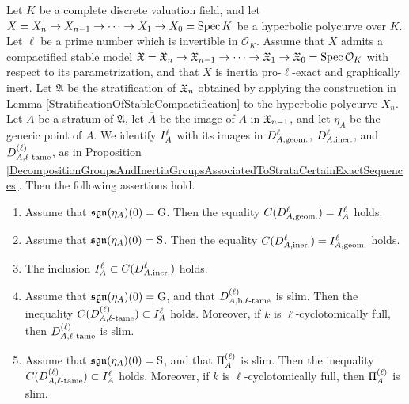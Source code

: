 \begin{prop}\label{ComputationOfCentersOfVariousDecompositionGroups}
  Let $K$ be a complete discrete valuation field, and let $X = X_n \to X_{n - 1} \to \cdots \to X_1 \to X_0 = \mathrm{Spec} \, K$ be a hyperbolic polycurve over $K$. Let $\ell$ be a prime number which is invertible in $\mathcal{O}_K$. Assume that $X$ admits a compactified stable model $\mathfrak{X} = \mathfrak{X}_n \to \mathfrak{X}_{n - 1} \to \cdots \to \mathfrak{X}_1 \to \mathfrak{X}_0 = \mathrm{Spec} \, \mathcal{O}_K$ with respect to its parametrization, and that $X$ is inertia pro-$\ell$-exact and graphically inert. Let $\mathfrak{A}$ be the stratification of $\mathfrak{X}_n$ obtained by applying the construction in Lemma \ref{StratificationOfStableCompactification} to the hyperbolic polycurve $X_n$. Let $A$ be a stratum of $\mathfrak{A}$, let $\overline{A}$ be the image of $A$ in $\mathfrak{X}_{n - 1}$, and let $\eta_A$ be the generic point of $A$. We identify $I^{\ell}_{A}$ with its images in $D^{\ell}_{A, \text{geom.}}$, $D^{\ell}_{A, \text{iner.}}$, and $D^{(\ell)}_{A, \ell\text{-tame}}$, as in Proposition \ref{DecompositionGroupsAndInertiaGroupsAssociatedToStrataCertainExactSequences}. Then the following assertions hold.
  \begin{enumerate}
    \item Assume that $\mathfrak{sgn}(\eta_A)(0) = \mathrm{G}$. Then the equality $C(D^{\ell}_{A, \text{geom.}}) = I^{\ell}_{A}$ holds.
    \item Assume that $\mathfrak{sgn}(\eta_A)(0) = \mathrm{S}$. Then the equality $C(D^{\ell}_{A, \text{iner.}}) = I^{\ell}_{A, \text{geom.}}$ holds.
    \item The inclusion $I^{\ell}_{A} \subset C(D^{\ell}_{A, \text{iner.}})$ holds.
    \item Assume that $\mathfrak{sgn}(\eta_A)(0) = \mathrm{G}$, and that $D^{(\ell)}_{A, \text{b.} \ell\text{-tame}}$ is slim. Then the inequality $C(D^{(\ell)}_{A, \ell\text{-tame}}) \subset I^{\ell}_{A}$ holds. Moreover, if $k$ is $\ell$-cyclotomically full, then $D^{(\ell)}_{A, \ell\text{-tame}}$ is slim.
    \item Assume that $\mathfrak{sgn}(\eta_A)(0) = \mathrm{S}$, and that $\Pi^{(\ell)}_{A}$ is slim. Then the inequality $C(D^{(\ell)}_{A, \ell\text{-tame}}) \subset I^{\ell}_{A}$ holds. Moreover, if $k$ is $\ell$-cyclotomically full, then $\Pi^{(\ell)}_{A}$ is slim.
  \end{enumerate}
\end{prop}
